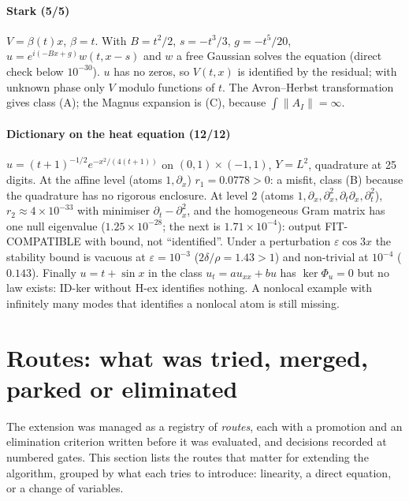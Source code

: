 \documentclass[11pt]{article}
\theoremstyle{plain}
\theoremstyle{definition}
\theoremstyle{remark}
\newcommand{\lab}[1]{\textsf{#1}}           %
\newcommand{\FC}{\lab{FIT-COMPATIBLE}}
\begin{document}
\paragraph{Stark (5/5)} $V=\beta(t)x$, $\beta=t$. With $B=t^2/2$, $s=-t^3/3$, $g=-t^5/20$, $u=e^{i(-Bx+g)}w(t,x-s)$ and $w$ a free Gaussian solves the equation (direct check below $10^{-30}$). $u$ has no zeros, so $V(t,x)$ is identified by the residual; with unknown phase only $V$ modulo functions of $t$. The Avron--Herbst transformation gives class (A); the Magnus expansion is (C), because $\int\lVert A_I\rVert=\infty$.

\paragraph{Dictionary on the heat equation (12/12)} $u=(t+1)^{-1/2}e^{-x^2/(4(t+1))}$ on $(0,1)\times(-1,1)$, $Y=L^2$, quadrature at 25 digits. At the affine level (atoms $1,\partial_x$) $r_1=0.0778>0$: a misfit, class (B) because the quadrature has no rigorous enclosure. At level 2 (atoms $1,\partial_x,\partial_x^2,\partial_t\partial_x,\partial_t^2$), $r_2\approx4\times10^{-33}$ with minimiser $\partial_t-\partial_x^2$, and the homogeneous Gram matrix has one null eigenvalue ($1.25\times10^{-28}$; the next is $1.71\times10^{-4}$): output \FC{} with bound, not ``identified''.
Under a perturbation $\varepsilon\cos3x$ the stability bound is vacuous at $\varepsilon=10^{-3}$ ($2\delta/\rho=1.43>1$) and non-trivial at $10^{-4}$ ($0.143$).
Finally $u=t+\sin x$ in the class $u_t=au_{xx}+bu$ has $\ker\Phi_u=0$ but no law exists: ID-ker without H-ex identifies nothing. A nonlocal example with infinitely many modes that identifies a nonlocal atom is still missing.


\section{Routes: what was tried, merged, parked or eliminated}\label{sec:routes}
The extension was managed as a registry of \emph{routes}, each with a promotion and an elimination criterion written before it was evaluated, and decisions recorded at numbered gates. This section lists the routes that matter for extending the algorithm, grouped by what each tries to introduce: linearity, a direct equation, or a change of variables.
\end{document}
